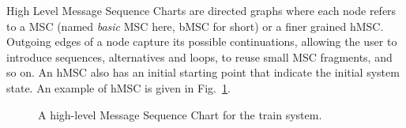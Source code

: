 High Level Message Sequence Charts are directed graphs where each node refers to a MSC (named \emph{basic} MSC here, bMSC for short) or a finer grained hMSC. Outgoing edges of a node capture its possible continuations, allowing the user to introduce sequences, alternatives and loops, to reuse small MSC fragments, and so on. An hMSC also has an initial starting point that indicate the initial system state. An example of hMSC is given in Fig.~\ref{image:train-hmsc}.

\vspace{0.4cm}
\begin{figure}[H]\centering
{}
\caption{A high-level Message Sequence Chart for the train system.\label{image:train-hmsc}}
\end{figure}

